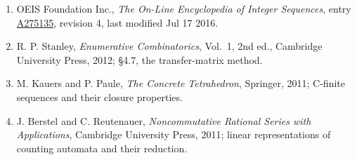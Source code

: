 \documentclass[11pt]{article}
\theoremstyle{definition}
\begin{document}
\begin{enumerate}

\item OEIS Foundation Inc., \emph{The On-Line Encyclopedia of Integer Sequences}, entry \href{https://oeis.org/A275135}{A275135}, revision 4, last modified Jul 17 2016.

\item R. P. Stanley, \emph{Enumerative Combinatorics}, Vol.~1, 2nd ed., Cambridge University Press, 2012; \S4.7, the transfer-matrix method.

\item M. Kauers and P. Paule, \emph{The Concrete Tetrahedron}, Springer, 2011; C-finite sequences and their closure properties.

\item J. Berstel and C. Reutenauer, \emph{Noncommutative Rational Series with Applications}, Cambridge University Press, 2011; linear representations of counting automata and their reduction.

\end{enumerate}
\end{document}
